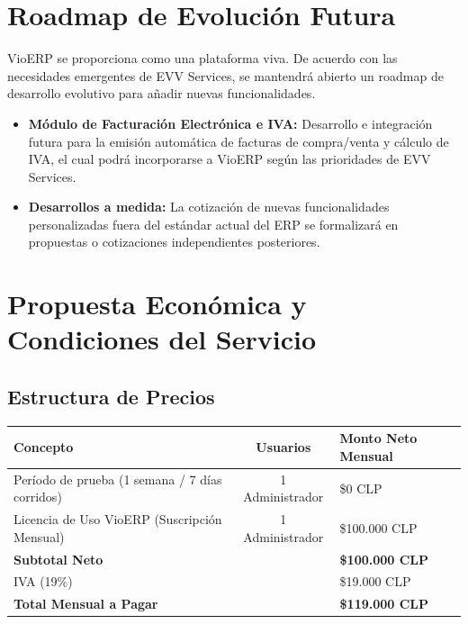 \documentclass[11pt,letterpaper]{article}
\begin{document}
\section{Roadmap de Evolución Futura}

VioERP se proporciona como una plataforma viva. De acuerdo con las necesidades emergentes de EVV Services, se mantendrá abierto un roadmap de desarrollo evolutivo para añadir nuevas funcionalidades.

\begin{itemize}[leftmargin=1.2em]
  \item \textbf{Módulo de Facturación Electrónica e IVA:} Desarrollo e integración futura para la emisión automática de facturas de compra/venta y cálculo de IVA, el cual podrá incorporarse a VioERP según las prioridades de EVV Services.
  \item \textbf{Desarrollos a medida:} La cotización de nuevas funcionalidades personalizadas fuera del estándar actual del ERP se formalizará en propuestas o cotizaciones independientes posteriores.
\end{itemize}

\section{Propuesta Económica y Condiciones del Servicio}

\subsection{Estructura de Precios}

\begin{table}[htbp]
\centering
\begin{tabularx}{\textwidth}{X c >{\raggedleft\arraybackslash}p{3.5cm}}
\toprule
\textbf{Concepto} & \textbf{Usuarios} & \textbf{Monto Neto Mensual} \\
\midrule
Período de prueba (1 semana / 7 días corridos) & 1 Administrador & \$0 CLP \\
Licencia de Uso VioERP (Suscripción Mensual) & 1 Administrador & \$100.000 CLP \\
\midrule
\textbf{Subtotal Neto} & & \textbf{\$100.000 CLP} \\
IVA (19\%) & & \$19.000 CLP \\
\textbf{Total Mensual a Pagar} & & \textbf{\$119.000 CLP} \\
\bottomrule
\end{tabularx}
\end{table}
\end{document}
